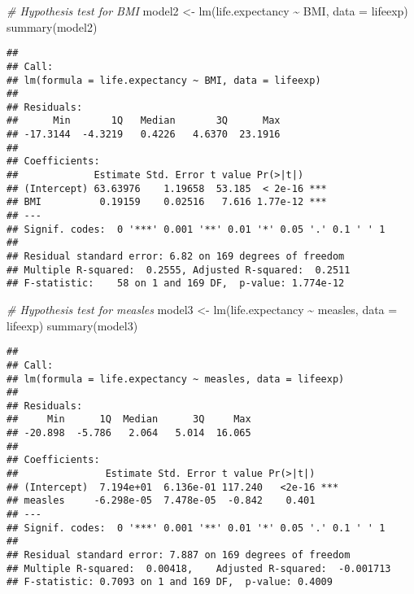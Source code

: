 \documentclass[
]{article}
\newenvironment{Shaded}{\begin{snugshade}}{\end{snugshade}}
\newcommand{\AttributeTok}[1]{\textcolor[rgb]{0.77,0.63,0.00}{#1}}
\newcommand{\CommentTok}[1]{\textcolor[rgb]{0.56,0.35,0.01}{\textit{#1}}}
\newcommand{\FunctionTok}[1]{\textcolor[rgb]{0.00,0.00,0.00}{#1}}
\newcommand{\NormalTok}[1]{#1}
\newcommand{\OtherTok}[1]{\textcolor[rgb]{0.56,0.35,0.01}{#1}}
\newcommand{\SpecialCharTok}[1]{\textcolor[rgb]{0.00,0.00,0.00}{#1}}
\begin{document}
\begin{Shaded}
\begin{Highlighting}[]
\CommentTok{\# Hypothesis test for BMI}
\NormalTok{model2 }\OtherTok{\textless{}{-}} \FunctionTok{lm}\NormalTok{(life.expectancy }\SpecialCharTok{\textasciitilde{}}\NormalTok{ BMI, }\AttributeTok{data =}\NormalTok{ lifeexp)}
\FunctionTok{summary}\NormalTok{(model2)}
\end{Highlighting}
\end{Shaded}

\begin{verbatim}
## 
## Call:
## lm(formula = life.expectancy ~ BMI, data = lifeexp)
## 
## Residuals:
##      Min       1Q   Median       3Q      Max 
## -17.3144  -4.3219   0.4226   4.6370  23.1916 
## 
## Coefficients:
##             Estimate Std. Error t value Pr(>|t|)    
## (Intercept) 63.63976    1.19658  53.185  < 2e-16 ***
## BMI          0.19159    0.02516   7.616 1.77e-12 ***
## ---
## Signif. codes:  0 '***' 0.001 '**' 0.01 '*' 0.05 '.' 0.1 ' ' 1
## 
## Residual standard error: 6.82 on 169 degrees of freedom
## Multiple R-squared:  0.2555, Adjusted R-squared:  0.2511 
## F-statistic:    58 on 1 and 169 DF,  p-value: 1.774e-12
\end{verbatim}

\begin{Shaded}
\begin{Highlighting}[]
\CommentTok{\# Hypothesis test for measles}
\NormalTok{model3 }\OtherTok{\textless{}{-}} \FunctionTok{lm}\NormalTok{(life.expectancy }\SpecialCharTok{\textasciitilde{}}\NormalTok{ measles, }\AttributeTok{data =}\NormalTok{ lifeexp)}
\FunctionTok{summary}\NormalTok{(model3)}
\end{Highlighting}
\end{Shaded}

\begin{verbatim}
## 
## Call:
## lm(formula = life.expectancy ~ measles, data = lifeexp)
## 
## Residuals:
##     Min      1Q  Median      3Q     Max 
## -20.898  -5.786   2.064   5.014  16.065 
## 
## Coefficients:
##               Estimate Std. Error t value Pr(>|t|)    
## (Intercept)  7.194e+01  6.136e-01 117.240   <2e-16 ***
## measles     -6.298e-05  7.478e-05  -0.842    0.401    
## ---
## Signif. codes:  0 '***' 0.001 '**' 0.01 '*' 0.05 '.' 0.1 ' ' 1
## 
## Residual standard error: 7.887 on 169 degrees of freedom
## Multiple R-squared:  0.00418,    Adjusted R-squared:  -0.001713 
## F-statistic: 0.7093 on 1 and 169 DF,  p-value: 0.4009
\end{verbatim}
\end{document}
